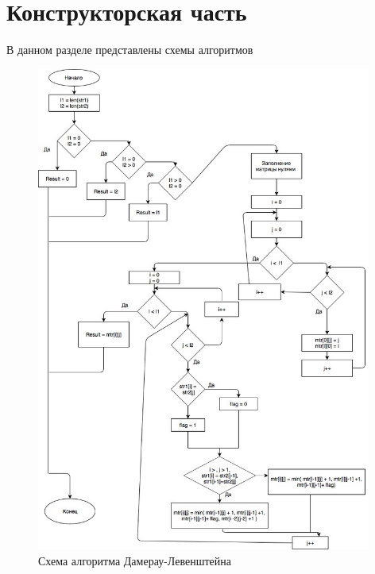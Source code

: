 \documentclass[12pt]{article}
\begin{document}
\section{Конструкторская часть}
В данном разделе представлены схемы алгоритмов 
\begin{figure}[ht!]
\centering
\includegraphics[width=110mm]{damerau.jpg}
\caption{Схема алгоритма Дамерау-Левенштейна \label{overflow}}
\end{figure}
\end{document}
